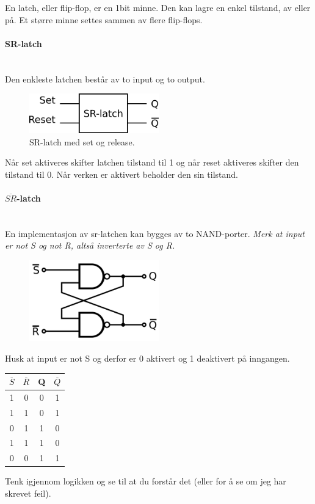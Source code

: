 En latch, eller flip-flop, er en 1bit minne.
Den kan lagre en enkel tilstand, av eller på.
Et større minne settes sammen av flere flip-flops.



\paragraph{SR-latch} \mbox{} \\
Den enkleste latchen består av to input og to output.
\begin{figure}[H]
  \caption{SR-latch med set og release.}
  \centering
  \includegraphics[width=0.5\textwidth]{./img/sr-latch}
\end{figure}
Når set aktiveres skifter latchen tilstand til 1 og når reset aktiveres
skifter den tilstand til 0.
Når verken er aktivert beholder den sin tilstand.



\paragraph{$\overline{SR}$-latch} \mbox{} \\
En implementasjon av sr-latchen kan bygges av to NAND-porter.
\emph{Merk at input er not S og not R, altså inverterte av S og R.}
\begin{figure}[H]
  \centering
  \includegraphics[width=0.5\textwidth]{./img/not-sr}
\end{figure}
Husk at input er not S og derfor er 0 aktivert og 1 deaktivert på inngangen.
\begin{table}[H]
  \centering
  \begin{tabular}{c|c|c|c}
    $\overline{S}$ & $\overline{R}$ & Q & $\overline{Q}$ \\ \hline
    1 & 0 & 0 & 1 \\
    1 & 1 & 0 & 1 \\
    0 & 1 & 1 & 0 \\
    1 & 1 & 1 & 0 \\
    0 & 0 & 1 & 1
  \end{tabular}
\end{table}
Tenk igjennom logikken og se til at du forstår det (eller for å se om jeg har
skrevet feil).




